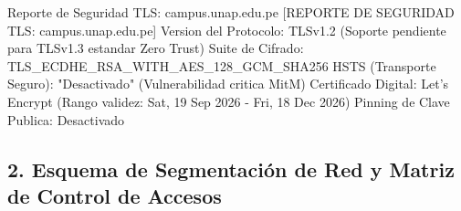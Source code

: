 \begin{cmdbox}{Reporte de Seguridad TLS: campus.unap.edu.pe}
[REPORTE DE SEGURIDAD TLS: campus.unap.edu.pe]
Version del Protocolo:     TLSv1.2 (Soporte pendiente para TLSv1.3 estandar Zero Trust)
Suite de Cifrado:          TLS_ECDHE_RSA_WITH_AES_128_GCM_SHA256
HSTS (Transporte Seguro):  "Desactivado" (Vulnerabilidad critica MitM)
Certificado Digital:       Let's Encrypt (Rango validez: Sat, 19 Sep 2026 - Fri, 18 Dec 2026)
Pinning de Clave Publica:  Desactivado
\end{cmdbox}

\subsection*{2. Esquema de Segmentación de Red y Matriz de Control de Accesos}

